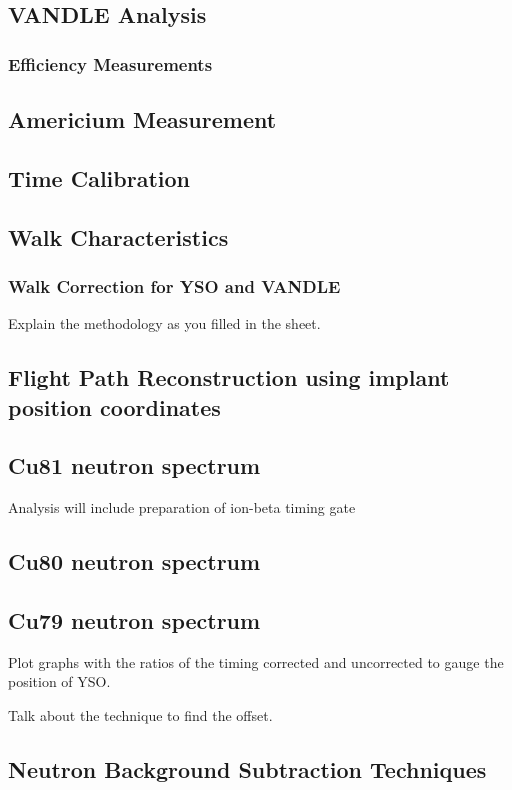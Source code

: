 \documentclass[a4paper,12pt,twoside]{report}
\begin{document}
\subsection{VANDLE Analysis}
\subsubsection{Efficiency Measurements}
\subsection{Americium Measurement}
\subsection{Time Calibration}
\subsection{Walk Characteristics}
\subsubsection {Walk Correction for YSO and VANDLE}
Explain the methodology as you filled in the sheet.
\subsection{Flight Path Reconstruction using implant position coordinates}
\subsection{Cu81 neutron spectrum}

Analysis will include preparation of ion-beta timing gate

\subsection{Cu80 neutron spectrum}
\subsection{Cu79 neutron spectrum}




Plot graphs with the ratios of the timing corrected and uncorrected to gauge the position of YSO.

Talk about the technique to find the offset.

\subsection{Neutron Background Subtraction Techniques}
\end{document}
